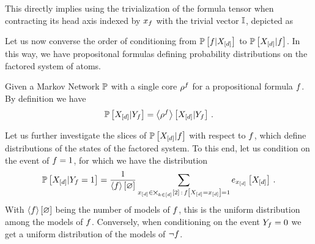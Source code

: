 

This directly implies using   the trivialization of the formula tensor when contracting its head axis indexed by $x_{f}$ with the trivial vector $\mathbb{I}$, depicted as
\begin{center}
	
\end{center}




Let us now converse the order of conditioning from $\mathbb{P}\left[f|X_{[d]}\right]$ to $\mathbb{P}\left[X_{[d]}|f\right]$.
In this way, we have propositonal formulas defining probability distributions on the factored system of atoms.

Given a Markov Network $\mathbb{P}$ with a single core $\rho^{f}$ for a propositional formula $f$.
By definition we have
\begin{align*}
	\mathbb{P}\left[X_{[d]}|Y_{f}\right] 
	= \left\langle \rho^{f}\right\rangle \left[ X_{[d]} | Y_{f} \right] \, .  
\end{align*}
\begin{center}
	
\end{center}

Let us further investigate the slices of $\mathbb{P}\left[X_{[d]}|f\right]$ with respect to $f$, which define distributions of the states of the factored system.
To this end, let us condition on the event of $f=1$, for which we have the distribution
\begin{align}\label{eq:eventFormulaProb}
	\mathbb{P}\left[X_{[d]}|Y_{f}=1\right] = \frac{1}{\left\langle f\right\rangle \left[ \varnothing \right]} \sum_{x_{[d]}\in\bigtimes_{k\in[d]}[2] \, : \, f\left[X_{[d]}=x_{[d]}\right]=1} e_{x_{[d]}}\left[X_{[d]}\right] \, .
\end{align}
With $\left\langle f\right\rangle \left[ \varnothing \right]$ being the number of models of $f$,  this is the uniform distribution among the models of $f$.
Conversely, when conditioning on the event $Y_{f}=0$ we get a uniform distribution of the models of $\lnot f$.

